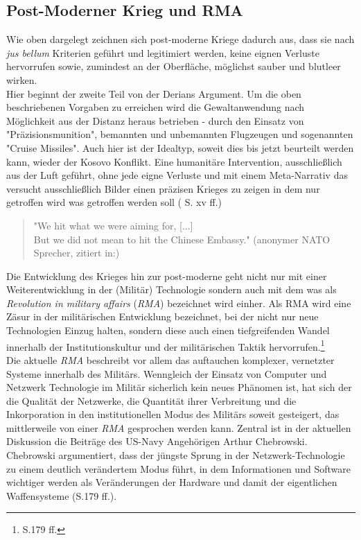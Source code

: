 \documentclass[11pt,a4paper,oneside,numbers=noenddot,bibliography=totocnumbered,DIV=13]{scrartcl}
\begin{document}
\subsection{Post-Moderner Krieg und RMA}
Wie oben dargelegt zeichnen sich post-moderne Kriege dadurch aus, dass sie nach \textit{jus bellum} Kriterien geführt und legitimiert werden, keine eignen Verluste hervorrufen sowie, zumindest an der Oberfläche, möglichst sauber und blutleer wirken.\\
Hier beginnt der zweite Teil von der Derians Argument. Um die oben beschriebenen Vorgaben zu erreichen wird die Gewaltanwendung nach Möglichkeit aus der Distanz heraus betrieben - durch den Einsatz von "Präzisionsmunition", bemannten und unbemannten Flugzeugen und sogenannten "Cruise Missiles". Auch hier ist der Idealtyp, soweit dies bis jetzt beurteilt werden kann, wieder der Kosovo Konflikt. Eine humanitäre Intervention, ausschließlich aus der Luft geführt, ohne jede eigne Verluste und mit einem Meta-Narrativ das versucht ausschließlich Bilder einen präzisen Krieges zu zeigen in dem nur getroffen wird was getroffen werden soll ({\cite{DerDerian2001} S. xv ff.})
\begin{quote}
"We hit what we were aiming for, [...]\\
 But we did not mean to hit the Chinese Embassy." (anonymer NATO Sprecher, zitiert in:\cite{gordon_crisis_1999}) 
\end{quote}
Die Entwicklung des Krieges hin zur post-moderne geht nicht nur mit einer Weiterentwicklung in der (Militär) Technologie sondern auch mit dem was als \textit{Revolution in military affairs} (\textit{RMA}) bezeichnet wird einher. Als RMA wird eine Zäsur in der militärischen Entwicklung bezeichnet, bei der nicht nur neue Technologien Einzug halten, sondern diese auch einen tiefgreifenden Wandel innerhalb der Institutionskultur und der militärischen Taktik hervorrufen.\footnote{\cite{singer_wired_2010} S.179 ff.} \\
Die aktuelle \textit{RMA} beschreibt vor allem das auftauchen komplexer, vernetzter Systeme innerhalb des Militärs. Wenngleich der Einsatz von Computer und Netzwerk Technologie im Militär sicherlich kein neues Phänomen ist, hat sich der die Qualität der Netzwerke, die Quantität ihrer Verbreitung und die Inkorporation in den institutionellen Modus des Militärs soweit gesteigert, das mittlerweile von einer \textit{RMA} gesprochen werden kann.
Zentral ist in der aktuellen Diskussion die Beiträge des US-Navy Angehörigen Arthur Chebrowski. Chebrowski argumentiert, dass der jüngste Sprung in der Netzwerk-Technologie zu einem deutlich verändertem Modus führt, in dem Informationen und Software wichtiger werden als Veränderungen der Hardware und damit der eigentlichen Waffensysteme (\cite{singer_wired_2010}S.179 ff.).
\end{document}
